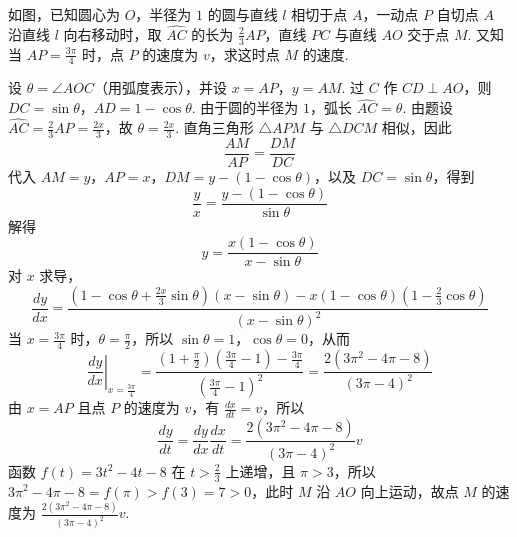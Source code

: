 \documentclass[UTF8,a4paper,oneside,11pt]{ctexbook}
\begin{document}
\begin{problem}

如图，已知圆心为 \(O\)，半径为 \(1\) 的圆与直线 \(l\) 相切于点 \(A\)，一动点 \(P\) 自切点 \(A\) 沿直线 \(l\) 向右移动时，取 \(\widehat{AC}\) 的长为 \(\frac{2}{3} AP\)，直线 \(PC\) 与直线 \(AO\) 交于点 \(M\). 又知当 \(AP = \frac{3\pi}{4}\) 时，点 \(P\) 的速度为 \(v\)，求这时点 \(M\) 的速度.

\FloatBarrier
\end{problem}

\begin{solution}
设 \(\theta=\angle AOC\)（用弧度表示），并设 \(x=AP\)，\(y=AM\). 过 \(C\) 作 \(CD\perp AO\)，则 \(DC=\sin\theta\)，\(AD=1-\cos\theta\).
由于圆的半径为 \(1\)，弧长 \(\widehat{AC}=\theta\). 由题设 \(\widehat{AC}=\frac{2}{3}AP=\frac{2x}{3}\)，故 \(\theta=\frac{2x}{3}\).
直角三角形 \(\triangle APM\) 与 \(\triangle DCM\) 相似，因此
\[
\frac{AM}{AP}=\frac{DM}{DC}
\]
代入 \(AM=y\)，\(AP=x\)，\(DM=y-(1-\cos\theta)\)，以及 \(DC=\sin\theta\)，得到
\[
\frac{y}{x}=\frac{y-(1-\cos\theta)}{\sin\theta}
\]
解得
\[
y=\frac{x(1-\cos\theta)}{x-\sin\theta}
\]
对 \(x\) 求导，
\[
\frac{dy}{dx}=\frac{\left(1-\cos\theta+\frac{2x}{3}\sin\theta\right)(x-\sin\theta)-x(1-\cos\theta)\left(1-\frac{2}{3}\cos\theta\right)}{(x-\sin\theta)^2}
\]
当 \(x=\frac{3\pi}{4}\) 时，\(\theta=\frac\pi2\)，所以 \(\sin\theta=1\)，\(\cos\theta=0\)，从而
\[
\left.\frac{dy}{dx}\right|_{x=\frac{3\pi}{4}}=\frac{\left(1+\frac\pi2\right)\left(\frac{3\pi}{4}-1\right)-\frac{3\pi}{4}}{\left(\frac{3\pi}{4}-1\right)^2}=\frac{2(3\pi^2-4\pi-8)}{(3\pi-4)^2}
\]
由 \(x=AP\) 且点 \(P\) 的速度为 \(v\)，有 \(\frac{dx}{dt}=v\)，所以
\[
\frac{dy}{dt}=\frac{dy}{dx}\frac{dx}{dt}=\frac{2(3\pi^2-4\pi-8)}{(3\pi-4)^2}v
\]
函数 \(f(t)=3t^2-4t-8\) 在 \(t>\frac23\) 上递增，且 \(\pi>3\)，所以 \(3\pi^2-4\pi-8=f(\pi)>f(3)=7>0\)，此时 \(M\) 沿 \(AO\) 向上运动，故点 \(M\) 的速度为 \(\frac{2(3\pi^2-4\pi-8)}{(3\pi-4)^2}v\).
\end{solution}

\end{document}
